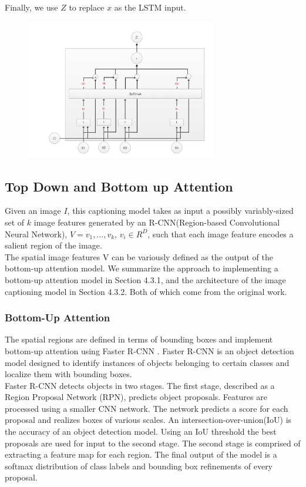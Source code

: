 \documentclass[a4paper]{article}
\begin{document}
\noindent Finally, we use $Z$ to replace $x$ as the LSTM input.

\begin{figure}[H]
\centering
\includegraphics[width=0.75\textwidth]{11.png}
\end{figure}

\subsection{Top Down and Bottom up Attention}
Given an image $I$, this captioning model takes as input a possibly variably-sized set of $k$ image features generated by an R-CNN(Region-based Convolutional Neural Network), $V = {v_1, ..., v_k}$, $v_i \in R^D$, such that each image feature encodes a salient region of the image.\\
\noindent The spatial image features V can be variously defined as the output of  the bottom-up attention model. We summarize the approach to implementing a bottom-up attention model in Section 4.3.1, and the architecture of the image captioning model in Section 4.3.2. Both of which come from the original work. \cite{DBLP:journals/corr/AndersonHBTJGZ17}
\\

\subsubsection{Bottom-Up Attention}
The spatial regions are defined in terms of
bounding boxes and implement bottom-up attention using
Faster R-CNN \cite{ren2015faster}. Faster R-CNN is an object detection
model designed to identify instances of objects belonging
to certain classes and localize them with bounding boxes.
\\

\noindent 
Faster R-CNN detects objects in two stages. The first
stage, described as a Region Proposal Network (RPN), predicts
object proposals. Features are processed using a smaller CNN network. The network predicts a score for each proposal and realizes boxes of various scales. An intersection-over-union(IoU) is the accuracy of an object detection model. Using an IoU threshold the best proposals are used for input to the second stage. The second stage is comprised of extracting a feature map for each region. The final output of the model is a softmax distribution of class labels and bounding box refinements of every proposal.
\\
\end{document}
